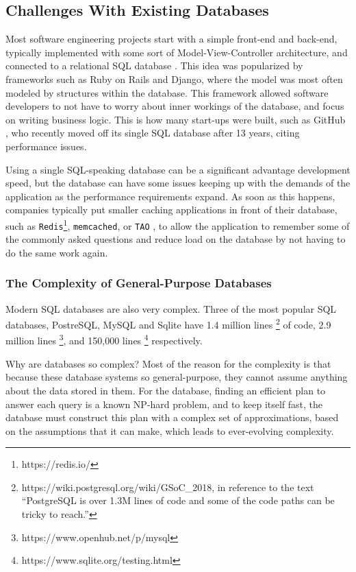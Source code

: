 \documentclass[10pt,twocolumn]{article}
\begin{document}
\subsection{Challenges With Existing Databases}

Most software engineering projects start with a simple front-end and back-end,
typically implemented with some sort of Model-View-Controller architecture, and
connected to a relational SQL database \cite{sqliteOnlyDatabase}. This idea was
popularized by frameworks such as Ruby on Rails and Django, where the model was
most often modeled by structures within the database. This framework allowed
software developers to not have to worry about inner workings of the database,
and focus on writing business logic. This is how many start-ups were built, such
as GitHub \cite{githubSingleSQL}, who recently moved off its single SQL database
after 13 years, citing performance issues.

Using a single SQL-speaking database can be a significant advantage development
speed, but the database can have some issues keeping up with the demands of the
application as the performance requirements expand.
As soon as this happens, companies typically put smaller caching applications in
front of their database, such as \verb|Redis|\footnote{https://redis.io/},
\verb|memcached|\cite{nishtala2013scaling}, or \verb|TAO| \cite{bronson2013tao},
to allow the application to remember some of the commonly asked questions and
reduce load on the database by not having to do the same work again.

\subsubsection{The Complexity of General-Purpose Databases}
Modern SQL databases are also very complex. Three of the most popular SQL
databases, PostreSQL, MySQL and Sqlite have 1.4 million lines
\footnote{https://wiki.postgresql.org/wiki/GSoC\_2018, in reference to the
text ``PostgreSQL is over 1.3M lines of code and some of the code paths can be
tricky to reach.''} of code, 2.9 million lines
\footnote{https://www.openhub.net/p/mysql}, and 150,000 lines
\footnote{https://www.sqlite.org/testing.html} respectively.

Why are databases so complex? Most of the reason for the complexity is that
because these database systems so general-purpose, they cannot assume anything
about the data stored in them. For the database, finding an efficient plan to
answer each query is a known NP-hard problem\cite{chatterji2002complexity}, and
to keep itself fast, the database must construct this plan with a complex set of
approximations, based on the assumptions that it can make, which leads to
ever-evolving complexity.
\end{document}

